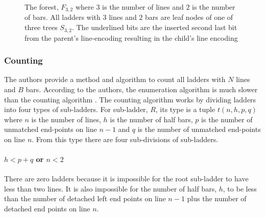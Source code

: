 \begin{figure}[!htp]
\begin{center}
\begin{minipage}{0.8\textwidth}
        \end{minipage}
    \end{center}
    \caption{The forest, $F_{3,2}$ where $3$ is the number of lines and $2$ is the number of bars. All ladders with $3$ lines and $2$ bars are leaf nodes of one of three trees $S_{3,2}$.
    The underlined bits are the inserted second last bit from the parent's line-encoding resulting in the child's line encoding}
    \label{fig:forest3,2}
\end{figure}


\subsubsection{Counting}
The authors provide a method and algorithm to count all ladders 
with $N$ lines and $B$ bars. According to the authors, the enumeration algorithm is 
much slower than the counting algorithm \cite{A6}. The counting algorithm 
works by dividing ladders into four types of sub-ladders.
For sub-ladder, $R$, its type is a tuple $t(n,h,p,q)$ where 
$n$ is the number of lines, $h$ is the number of half bars, 
$p$ is the number of unmatched end-points on line $n-1$ and 
$q$ is the number of unmatched end-points on line $n$. From this 
type there are four sub-divisions of sub-ladders.
\paragraph{ $h < p+q$ or $n<2$}
There are zero ladders because it is impossible for the 
root sub-ladder to have less than two lines. It is also 
impossible for the number of half bars, $h$, to 
be less than the number of detached left end points 
on line $n-1$ plus the number of detached end points on 
line $n$.

